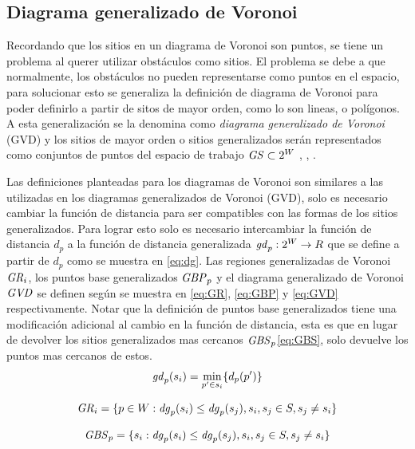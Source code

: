 \subsection{Diagrama generalizado de Voronoi}
Recordando que los sitios en un diagrama de Voronoi son puntos, se tiene un problema al querer utilizar obstáculos como sitios. El problema se debe a que normalmente, los obstáculos no pueden representarse como puntos en el espacio, para solucionar esto se generaliza la definición de diagrama de Voronoi para poder definirlo a partir de sitos de mayor orden, como lo son lineas, o polígonos. A esta generalización se la denomina como \emph{diagrama generalizado de Voronoi} (GVD) y los sitios de mayor orden o sitios generalizados serán representados como conjuntos de puntos del espacio de trabajo $\mathit{GS}\subset 2^{W}$ \cite{choset2005principles}, \cite{latombe1991}, \cite{wurm2008coordinated}.

Las definiciones planteadas para los diagramas de Voronoi son similares a las utilizadas en los diagramas generalizados de Voronoi (GVD), solo es necesario cambiar la función de distancia para ser compatibles con las formas de los sitios generalizados. Para lograr esto solo es necesario intercambiar la función de distancia $d_p$ a la función de distancia generalizada $\mathit{gd}_p : 2^{W} \rightarrow R$ que se define a partir de $d_p$ como se muestra en \ref{eq:dg}. Las regiones generalizadas de Voronoi $\mathit{GR}_i$, los puntos base generalizados $\mathit{GBP}_p$ y el diagrama generalizado de Voronoi $\mathit{GVD}$ se definen según se muestra en \ref{eq:GR}, \ref{eq:GBP} y \ref{eq:GVD} respectivamente. Notar que la definición de puntos base generalizados tiene una modificación adicional al cambio en la función de distancia, esta es que en lugar de devolver los sitios generalizados mas cercanos $\mathit{GBS}_p$\ref{eq:GBS}, solo devuelve los puntos mas cercanos de estos.
\begin{equation}
  \mathit{gd}_p(s_i) = \min_{p'\in s_i}\{d_p(p')\} \label{eq:dg}
\end{equation}

\begin{equation}
  \mathit{GR}_i = \{p \in W : \mathit{dg}_p(s_i) \leq \mathit{dg}_p(s_j), s_i,s_j\in S,s_j \neq s_i\}\label{eq:GR}
\end{equation}

\begin{equation}
  \mathit{GBS}_p = \{s_i : \mathit{dg}_p(s_i) \leq \mathit{dg}_p(s_j), s_i,s_j\in S,s_j \neq s_i\}\label{eq:GBS}
\end{equation}

